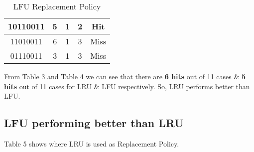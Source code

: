 \documentclass[12pt]{article}
\begin{document}
\begin{table}
\begin{tabular}{|c|c|c|c|c|}
\hline
10110011                                                                     & 5                  & 1                                                                         & 2                      & Hit                 \\ 
\hline
11010011                                                                     & 6                  & 1                                                                         & 3                      & Miss                \\
\hline
01110011                                                                     & 3                  & 1                                                                         & 3                      & Miss                 \\
\hline
\end{tabular}
\caption{LFU Replacement Policy}
\end{table}


From Table 3 and Table 4 we can see that there are \textbf{6 hits} out of 11 cases \& \textbf{5 hits} out of 11 cases for LRU \& LFU respectively. So, LRU performs better than LFU.

\subsection{LFU performing better than LRU}
Table 5 shows where LRU is used as Replacement Policy.
\end{document}
